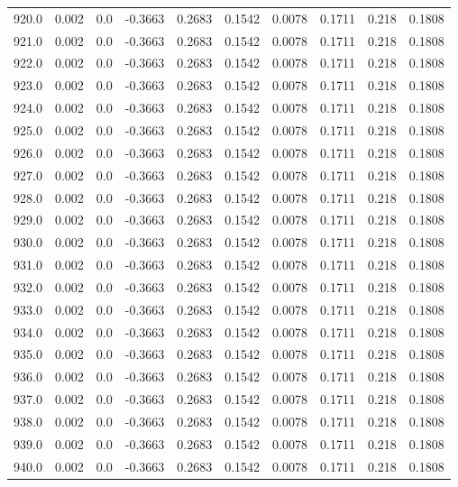 \begin{longtable}{lrrrrrrrrr}
920.0 & 0.002 & 0.0 & -0.3663 & 0.2683 & 0.1542 & 0.0078 & 0.1711 & 0.218 & 0.1808 \\
921.0 & 0.002 & 0.0 & -0.3663 & 0.2683 & 0.1542 & 0.0078 & 0.1711 & 0.218 & 0.1808 \\
922.0 & 0.002 & 0.0 & -0.3663 & 0.2683 & 0.1542 & 0.0078 & 0.1711 & 0.218 & 0.1808 \\
923.0 & 0.002 & 0.0 & -0.3663 & 0.2683 & 0.1542 & 0.0078 & 0.1711 & 0.218 & 0.1808 \\
924.0 & 0.002 & 0.0 & -0.3663 & 0.2683 & 0.1542 & 0.0078 & 0.1711 & 0.218 & 0.1808 \\
925.0 & 0.002 & 0.0 & -0.3663 & 0.2683 & 0.1542 & 0.0078 & 0.1711 & 0.218 & 0.1808 \\
926.0 & 0.002 & 0.0 & -0.3663 & 0.2683 & 0.1542 & 0.0078 & 0.1711 & 0.218 & 0.1808 \\
927.0 & 0.002 & 0.0 & -0.3663 & 0.2683 & 0.1542 & 0.0078 & 0.1711 & 0.218 & 0.1808 \\
928.0 & 0.002 & 0.0 & -0.3663 & 0.2683 & 0.1542 & 0.0078 & 0.1711 & 0.218 & 0.1808 \\
929.0 & 0.002 & 0.0 & -0.3663 & 0.2683 & 0.1542 & 0.0078 & 0.1711 & 0.218 & 0.1808 \\
930.0 & 0.002 & 0.0 & -0.3663 & 0.2683 & 0.1542 & 0.0078 & 0.1711 & 0.218 & 0.1808 \\
931.0 & 0.002 & 0.0 & -0.3663 & 0.2683 & 0.1542 & 0.0078 & 0.1711 & 0.218 & 0.1808 \\
932.0 & 0.002 & 0.0 & -0.3663 & 0.2683 & 0.1542 & 0.0078 & 0.1711 & 0.218 & 0.1808 \\
933.0 & 0.002 & 0.0 & -0.3663 & 0.2683 & 0.1542 & 0.0078 & 0.1711 & 0.218 & 0.1808 \\
934.0 & 0.002 & 0.0 & -0.3663 & 0.2683 & 0.1542 & 0.0078 & 0.1711 & 0.218 & 0.1808 \\
935.0 & 0.002 & 0.0 & -0.3663 & 0.2683 & 0.1542 & 0.0078 & 0.1711 & 0.218 & 0.1808 \\
936.0 & 0.002 & 0.0 & -0.3663 & 0.2683 & 0.1542 & 0.0078 & 0.1711 & 0.218 & 0.1808 \\
937.0 & 0.002 & 0.0 & -0.3663 & 0.2683 & 0.1542 & 0.0078 & 0.1711 & 0.218 & 0.1808 \\
938.0 & 0.002 & 0.0 & -0.3663 & 0.2683 & 0.1542 & 0.0078 & 0.1711 & 0.218 & 0.1808 \\
939.0 & 0.002 & 0.0 & -0.3663 & 0.2683 & 0.1542 & 0.0078 & 0.1711 & 0.218 & 0.1808 \\
940.0 & 0.002 & 0.0 & -0.3663 & 0.2683 & 0.1542 & 0.0078 & 0.1711 & 0.218 & 0.1808 \\

\end{longtable}
